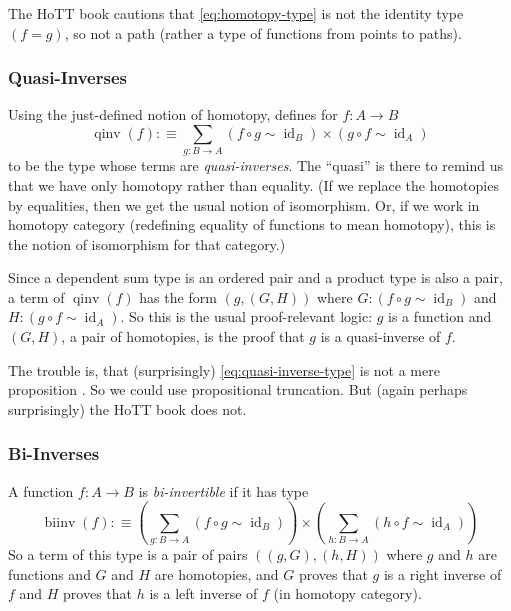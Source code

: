 \documentclass[11pt]{article}
\DeclareMathOperator{\idfun}{id}
\DeclareMathOperator{\qinv}{qinv}
\DeclareMathOperator{\binv}{biinv}
\begin{document}
The HoTT book cautions that \eqref{eq:homotopy-type} is not the identity
type $(f = g)$, so not a path
(rather a type of functions from points to paths).

\subsubsection{Quasi-Inverses}

Using the just-defined notion of homotopy,  defines for $f : A \to B$
\begin{equation} \label{eq:quasi-inverse-type}
   \qinv(f) :\equiv \sum_{g : B \to A}
   (f \circ g \sim \idfun_B) \times (g \circ f \sim \idfun_A)
\end{equation}
to be the type whose terms are \emph{quasi-inverses}.  The ``quasi''
is there to remind us that we have only homotopy rather than equality.
(If we replace the homotopies by equalities, then we get the usual
notion of isomorphism.  Or, if we work in homotopy category (redefining
equality of functions to mean homotopy), this
is the notion of isomorphism for that category.)

Since a dependent sum type is an ordered pair and a product type is also
a pair, a term of $\qinv(f)$ has the form $(g, (G, H))$
where $G : (f \circ g \sim \idfun_B)$
and $H : (g \circ f \sim \idfun_A)$.
So this is the usual proof-relevant logic:
$g$ is a function and $(G, H)$, a pair of homotopies, is the proof
that $g$ is a quasi-inverse of $f$.

The trouble is, that (surprisingly) \eqref{eq:quasi-inverse-type}
is not a mere proposition
.  So we could use propositional
truncation.  But (again perhaps surprisingly) the HoTT book does not.

\subsubsection{Bi-Inverses}

A function $f : A \to B$ is \emph{bi-invertible}
 if it has type
\begin{equation} \label{eq:bi-invertible-type}
   \binv(f) :\equiv \left( \sum_{g : B \to A} (f \circ g \sim \idfun_B)\right)
   \times \left( \sum_{h : B \to A} (h \circ f \sim \idfun_A)\right)
\end{equation}
So a term of this type is a pair of pairs $((g, G), (h, H))$
where $g$ and $h$ are functions and $G$ and $H$ are homotopies,
and $G$ proves that $g$ is a right inverse of $f$ and $H$ proves that
$h$ is a left inverse of $f$ (in homotopy category).
\end{document}
